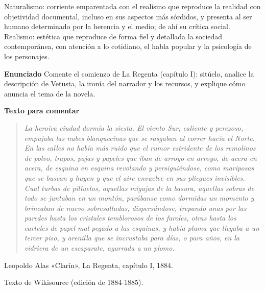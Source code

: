 \documentclass{book}
\begin{document}
\begin{tcolorbox}[title={Definición}, studiumdef, breakable]

Naturalismo: corriente emparentada con el realismo que reproduce la realidad con objetividad documental, incluso en sus aspectos más sórdidos, y presenta al ser humano determinado por la herencia y el medio; de ahí su crítica social. Realismo: estética que reproduce de forma fiel y detallada la sociedad contemporánea, con atención a lo cotidiano, el habla popular y la psicología de los personajes.

\end{tcolorbox}

\begin{tcolorbox}[title={Ejercicio resuelto}, studiumworked, breakable]

\noindent\textbf{Enunciado}
Comente el comienzo de La Regenta (capítulo I): sitúelo, analice la descripción de Vetusta, la ironía del narrador y los recursos, y explique cómo anuncia el tema de la novela.


\noindent\textbf{Texto para comentar}

\begin{quote}
\itshape La heroica ciudad dormía la siesta. El viento Sur, caliente y perezoso, empujaba las nubes blanquecinas que se rasgaban al correr hacia el Norte. En las calles no había más ruido que el rumor estridente de los remolinos de polvo, trapos, pajas y papeles que iban de arroyo en arroyo, de acera en acera, de esquina en esquina revolando y persiguiéndose, como mariposas que se buscan y huyen y que el aire envuelve en sus pliegues invisibles. Cual turbas de pilluelos, aquellas migajas de la basura, aquellas sobras de todo se juntaban en un montón, parábanse como dormidas un momento y brincaban de nuevo sobresaltadas, dispersándose, trepando unas por las paredes hasta los cristales temblorosos de los faroles, otras hasta los carteles de papel mal pegado a las esquinas, y había pluma que llegaba a un tercer piso, y arenilla que se incrustaba para días, o para años, en la vidriera de un escaparate, agarrada a un plomo.
\end{quote}
{\noindent\footnotesize Leopoldo Alas «Clarín», La Regenta, capítulo I, 1884.\par}
{\noindent\footnotesize Texto de Wikisource (edición de 1884-1885).\par}


\end{tcolorbox}
\end{document}
